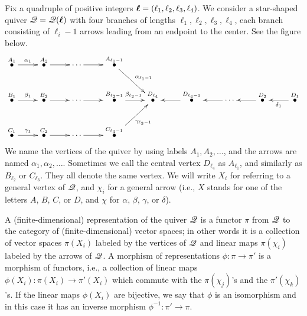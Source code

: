 \documentclass[12pt,reqno]{amsart}
\begin{document}
\label{section:2}

Fix a quadruple of positive integers
$ \boldsymbol{\ell}=(\ell_1,\ell_2,\ell_3,\ell_4) $.
We consider a star-shaped quiver $ \mathscr{Q}=\mathscr{Q}(\boldsymbol{\ell}) $ with four branches of lengths $\ell_1,\ell_2,\ell_3,\ell_4$,
each branch consisting of $\ell_i-1$ arrows leading from an endpoint to the center.
See the figure below.
%
\begin{equation}
\label{eq:quiver}
\xymatrix{
\stackrel{A_1}{\bullet} \ar^{\alpha_1}[r] & \stackrel{A_2}{\bullet} \ar[r] & \cdots \ar[r] & \stackrel{A_{\ell_1-1}}{\bullet} \ar^{\alpha_{\ell_1-1}}[rd] & \\
\stackrel{B_1}{\bullet} \ar^{\beta_1}[r] & \stackrel{B_2}{\bullet} \ar[r] & \cdots \ar[r] & \stackrel{B_{\ell_2-1}}{\bullet} \ar^{\beta_{\ell_2-1}}[r] & \stackrel{D_{\ell_4}}{\bullet} & \stackrel{D_{\ell_4-1}}{\bullet} \ar[l] & \cdots \ar[l] & \stackrel{D_2}{\bullet} \ar[l] & \stackrel{D_1}{\bullet} \ar^{\delta_1}[l] \\
\stackrel{C_1}{\bullet} \ar^{\gamma_1}[r] & \stackrel{C_2}{\bullet} \ar[r] & \cdots \ar[r] & \stackrel{C_{\ell_3-1}}{\bullet} \ar_{\gamma_{\ell_3-1}}[ru] & \\
}
\end{equation}
%
We name the vertices of the quiver by using labels $ A_1, A_2, \dots $, and the arrows are named $ \alpha_1, \alpha_2, \dots $.
Sometimes we call the central vertex $ D_{\ell_4} $ as $ A_{\ell_1} $, and similarly as
$ B_{\ell_2} $ or $ C_{\ell_3} $.  They all denote the same vertex.
We will write $X_i$ for referring to a general vertex of $\mathscr{Q}$, and $\chi_i$ for a general arrow (i.e., $X$ stands for one of the letters $A$, $B$, $C$, or $D$, and $\chi$ for $\alpha$, $\beta$, $\gamma$, or $\delta$).

A (finite-dimensional) representation of the quiver $\mathscr{Q}$ is a functor $\pi$ from $\mathscr{Q}$ to the category of (finite-dimensional) vector spaces;
in other words it is a collection of vector spaces $\pi(X_i)$ labeled by the vertices of $\mathscr{Q}$ and linear maps $\pi(\chi_i)$ labeled by the arrows
of $\mathscr{Q}$. A morphism of representations $\phi:\pi\to\pi'$ is a morphism of functors, i.e., a collection of linear maps $\phi(X_i):\pi(X_i)\to\pi'(X_i)$ which commute with the $\pi(\chi_j)$'s and the $\pi'(\chi_k)$'s. If the linear maps $\phi(X_i)$ are bijective, we say that $\phi$ is an isomorphism and in this case it has an inverse morphism $\phi^{-1}:\pi'\to\pi$.
\end{document}
